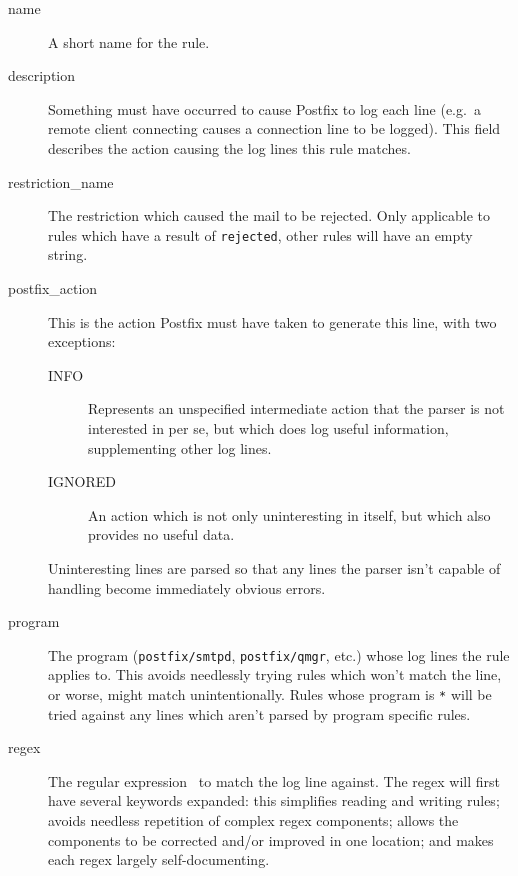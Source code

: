 \documentclass[a4paper,12pt,draft]{article}
\begin{document}
\begin{description}

    \item [name] A short name for the rule.

    \item [description] Something must have occurred to cause Postfix to
        log each line (e.g.\ a remote client connecting causes a connection
        line to be logged).  This field describes the action causing the
        log lines this rule matches.

    \item [restriction\_name] The restriction which caused the mail to be
        rejected.  Only applicable to rules which have a result of
        \texttt{rejected}, other rules will have an empty string.

    \item [postfix\_action] This is the action Postfix must have taken to
        generate this line, with two exceptions:

        \begin{description}

            \item [INFO] Represents an unspecified intermediate action that
                the parser is not interested in per se, but which does log
                useful information, supplementing other log lines.

            \item [IGNORED] An action which is not only uninteresting in
                itself, but which also provides no useful data.

        \end{description}

        Uninteresting lines are parsed so that any lines the parser isn't
        capable of handling become immediately obvious errors.

    \item [program] The program (\texttt{postfix/smtpd},
        \texttt{postfix/qmgr}, etc.) whose log lines the rule applies to.
        This avoids needlessly trying rules which won't match the line, or
        worse, might match unintentionally.  Rules whose program is
        \texttt{*} will be tried against any lines which aren't parsed by
        program specific rules.

    \item [regex] The regular expression~\cite{wikipedia-regex, perlre} to
        match the log line against.  The regex will first have several
        keywords expanded: this simplifies reading and writing rules;
        avoids needless repetition of complex regex components; allows the
        components to be corrected and/or improved in one location; and
        makes each regex largely self-documenting.
        

\end{description}
\end{document}
